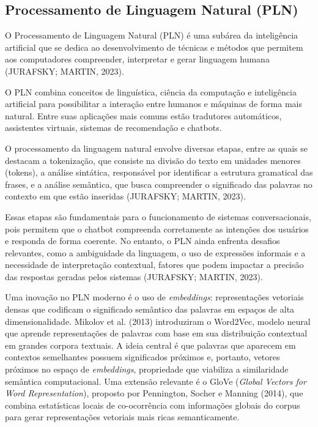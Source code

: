 \documentclass[12pt,a4paper]{extarticle}
\begin{document}
\subsection{Processamento de Linguagem Natural (PLN)}
\label{sec:pln}

O Processamento de Linguagem Natural (PLN) é uma subárea da inteligência artificial que se dedica ao desenvolvimento de técnicas e métodos que permitem aos computadores compreender, interpretar e gerar linguagem humana (JURAFSKY; MARTIN, 2023).

O PLN combina conceitos de linguística, ciência da computação e inteligência artificial para possibilitar a interação entre humanos e máquinas de forma mais natural. Entre suas aplicações mais comuns estão tradutores automáticos, assistentes virtuais, sistemas de recomendação e chatbots.

O processamento da linguagem natural envolve diversas etapas, entre as quais se destacam a tokenização, que consiste na divisão do texto em unidades menores (tokens), a análise sintática, responsável por identificar a estrutura gramatical das frases, e a análise semântica, que busca compreender o significado das palavras no contexto em que estão inseridas (JURAFSKY; MARTIN, 2023).

Essas etapas são fundamentais para o funcionamento de sistemas conversacionais, pois permitem que o chatbot compreenda corretamente as intenções dos usuários e responda de forma coerente. No entanto, o PLN ainda enfrenta desafios relevantes, como a ambiguidade da linguagem, o uso de expressões informais e a necessidade de interpretação contextual, fatores que podem impactar a precisão das respostas geradas pelos sistemas (JURAFSKY; MARTIN, 2023).

Uma inovação no PLN moderno é o uso de \textit{embeddings}: representações vetoriais densas que codificam o significado semântico das palavras em espaços de alta dimensionalidade. Mikolov et al. (2013) introduziram o Word2Vec, modelo neural que aprende representações de palavras com base em sua distribuição contextual em grandes corpora textuais. A ideia central é que palavras que aparecem em contextos semelhantes possuem significados próximos e, portanto, vetores próximos no espaço de \textit{embeddings}, propriedade que viabiliza a similaridade semântica computacional. Uma extensão relevante é o GloVe (\textit{Global Vectors for Word Representation}), proposto por Pennington, Socher e Manning (2014), que combina estatísticas locais de co-ocorrência com informações globais do corpus para gerar representações vetoriais mais ricas semanticamente.
\end{document}
